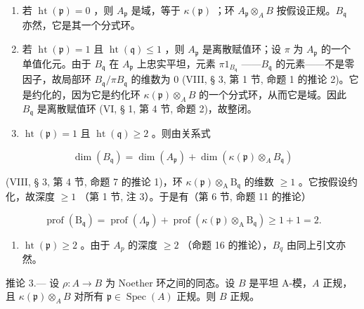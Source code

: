 \begin{enumerate}
\def\labelenumi{\arabic{enumi})}
\item
  若 \(\operatorname{ht}(\mathfrak{p}) = 0\) ，则 \(A_{\mathfrak{p}}\) 是域，等于 \(\kappa(\mathfrak{p})\) ；环 \(A_{\mathfrak{p}} \otimes_{A} B\) 按假设正规。\(B_{\mathfrak{q}}\) 亦然，它是其一个分式环。
\item
  若 \(\operatorname{ht}(\mathfrak{p}) = 1\) 且 \(\operatorname{ht}(\mathfrak{q}) \leqslant 1\) ，则 \(A_{\mathfrak{p}}\) 是离散赋值环；设 \(\pi\) 为 \(A_{\mathfrak{p}}\) 的一个单值化元。由于 \(B_{\mathfrak{q}}\) 在 \(A_{\mathfrak{p}}\) 上忠实平坦，元素 \(\pi 1_{B_{\mathfrak{q}}}\) ——\(B_{\mathfrak{q}}\) 的元素——不是零因子，故局部环 \(B_{\mathfrak{q}}/\pi B_{\mathfrak{q}}\) 的维数为 0 (VIII, § 3, 第 1 节, 命题 1 的推论 2)。它是约化的，因为它是约化环 \(\kappa(\mathfrak{p}) \otimes_{A} B\) 的一个分式环，从而它是域。因此 \(B_{\mathfrak{q}}\) 是离散赋值环 (VI, § 1, 第 4 节, 命题 2)，故整闭。
\item
  \(\operatorname{ht}(\mathfrak{p}) = 1\) 且 \(\operatorname{ht}(\mathfrak{q}) \geqslant 2\) 。则由关系式
\end{enumerate}

\[
\dim (B _ {\mathfrak {q}}) = \dim (A _ {\mathfrak {p}}) + \dim (\kappa (\mathfrak {p}) \otimes_ {A} B _ {\mathfrak {q}})
\]

(VIII, § 3, 第 4 节, 命题 7 的推论 1)，环 \(\kappa(\mathfrak{p})\otimes_{\mathrm{A}}\mathrm{B}_{\mathfrak{q}}\) 的维数 \(\geqslant 1\) 。它按假设约化，故深度 \(\geqslant 1\) （第 1 节, 注 3）。于是有（第 6 节, 命题 11 的推论）

\[
\operatorname{prof} \left(\mathrm{B} _ {\mathfrak {q}}\right) = \operatorname{prof} \left(\Lambda_ {\mathfrak {p}}\right) + \operatorname{prof} \left(\kappa (\mathfrak {p}) \otimes_ {\mathrm{A}} \mathrm{B} _ {\mathfrak {q}}\right) \geqslant 1 + 1 = 2.
\]

\begin{enumerate}
\def\labelenumi{\arabic{enumi})}
\setcounter{enumi}{3}
\tightlist
\item
  \(\operatorname{ht}(\mathfrak{p}) \geqslant 2\) 。由于 \(A_{p}\) 的深度 \(\geqslant 2\) （命题 16 的推论），\(B_{q}\) 由同上引文亦然。
\end{enumerate}

推论 3.--- 设 \(\rho: A \to B\) 为 Noether 环之间的同态。设 \(B\) 是平坦 A-模，\(A\) 正规，且 \(\kappa(\mathfrak{p}) \otimes_A B\) 对所有 \(\mathfrak{p} \in \operatorname{Spec}(A)\) 正规。则 \(B\) 正规。

